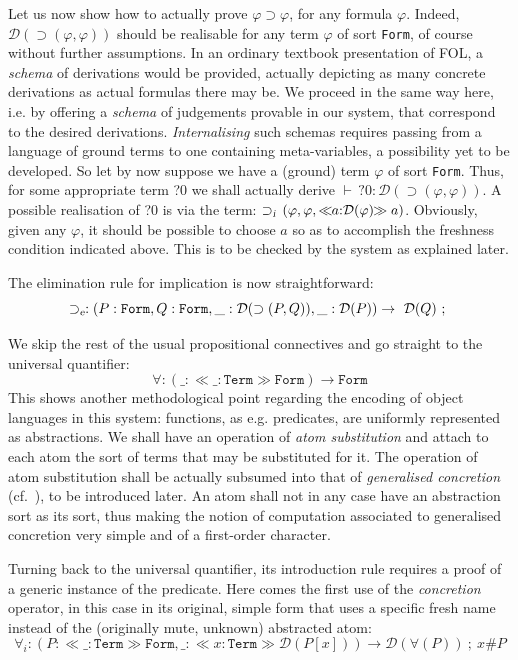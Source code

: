 \documentclass[copyright,creativecommons]{eptcs}
\newcounter{s}
\newcommand{\absort}[2]{\ensuremath{\ll\!\!#1\!\!\gg #2}}
\newcommand{\dabsterm}[3]{\ensuremath{\ll\!\!\ntyping{#1}{#2}\!\!\gg #3}}
\newcommand{\typing}[2]{\ensuremath{#1 : #2}}
\newcommand{\ntyping}[2]{\ensuremath{#1{:}#2}}
\newcommand{\fresh}[2]{#1 \# #2}
\newcommand{\fconstrdecl}[4]{\ensuremath{#1 : #2 \rightarrow\ #3\ ;\ #4}}
\newcommand{\tyjdgmnts}[2]{\ensuremath{\vdash \typing{#1}{#2}}}
\newcommand{\cnst}[1]{\textsl{#1}}
\newcommand{\form}{\texttt{Form}}
\newcommand{\prf}{\ensuremath{\mathcal{D}}}
\newcommand{\impl}{\ensuremath{\supset}}
\newcommand{\Trm}{\texttt{Term}}
\newcommand{\Frm}{\texttt{Form}}
\begin{document}
Let us now show how to actually prove $\varphi \impl \varphi$, for any formula $\varphi$. Indeed, $\prf(\impl(\varphi,\varphi))$ should be realisable for any term $\varphi$ of sort \form, of course without further assumptions. In an ordinary textbook presentation of FOL, a \emph{schema} of derivations would be provided, actually depicting as many concrete derivations as actual formulas there may be. 
We proceed in the same way here, i.e. by offering a \emph{schema} of judgements provable in our system, that correspond to the desired derivations. 
\emph{Internalising} such schemas requires passing from a language of ground terms to one containing meta-variables, a possibility yet to be developed. So let by now suppose we have a (ground) term $\varphi$ of sort \Frm.
Thus,  for some appropriate term ?0 we shall actually derive $\tyjdgmnts{\,?0}{\prf(\impl(\varphi,\varphi))}$.
A possible realisation of ?0 is via the term: $ \impl_{\cnst{i}}\, (\varphi, \varphi, \dabsterm{a}{\prf(\varphi)}{a})$.
Obviously, given any $\varphi$, it should be possible to choose $a$ so as to accomplish the freshness condition indicated above. This is to be checked by the system as explained later.

The elimination rule for implication is now straightforward:
\[\fconstrdecl{\impl_{\cnst{e}}}{(\typing{P}{\form}, \typing{Q}{\form},
    \typing{\_}{\prf(\impl(P, Q))}, \typing{\_}{\prf(P))}}{\prf(Q)}{}\]

\noindent We skip the rest of the usual propositional connectives and go straight to the universal quantifier:
\[
  \forall : (\_ : \absort{\_:\Trm}\Frm) \rightarrow \Frm
\]
This shows another methodological point regarding the encoding of object languages in this system: functions, as e.g. predicates, are uniformly represented as abstractions. We shall have an operation of \emph{atom substitution} and attach to each atom the sort of terms that may be substituted for it. The operation of atom substitution shall be actually subsumed into that of \emph{generalised concretion} (cf.~\cite{pitts:nomlfo-jv}), to be introduced later. An atom shall not in any case have an abstraction sort as its sort, thus making the notion of computation associated to generalised concretion very simple and of a first-order character.

Turning back to the universal quantifier, its introduction  rule requires a proof of a generic instance of the
predicate. Here comes the first use of the 
\emph{concretion} operator, in this case in its original, simple form 
that uses a specific fresh  name instead of the (originally
mute, unknown) abstracted atom:
\[
\forall_i  : (P : \absort{\_{:}\Trm}{\Frm},\_ :\absort{x{:}\Trm}{\prf(P[x])}) \to \prf(\forall (P)) \ ; \ \fresh{x}{P}
\]
\end{document}
